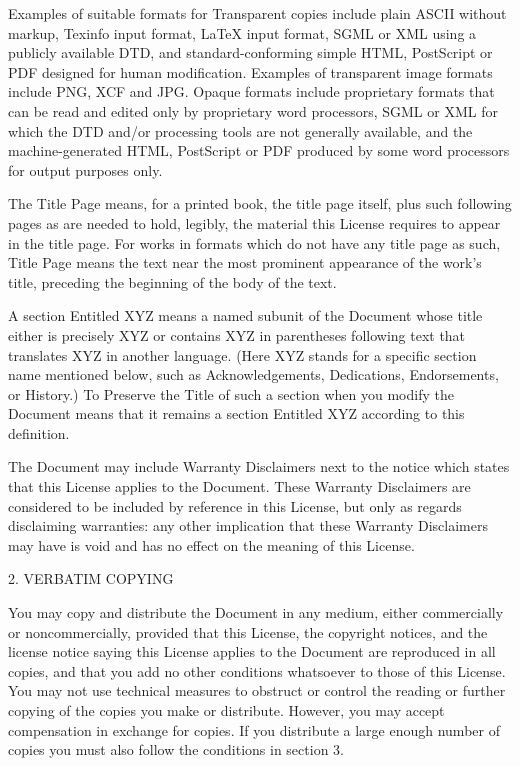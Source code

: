 \begin{noIndex}
Examples of suitable formats for Transparent copies include plain
ASCII without markup, Texinfo input format, LaTeX input format, SGML
or XML using a publicly available DTD, and standard-conforming simple
HTML, PostScript or PDF designed for human modification. Examples of
transparent image formats include PNG, XCF and JPG. Opaque formats
include proprietary formats that can be read and edited only by
proprietary word processors, SGML or XML for which the DTD and/or
processing tools are not generally available, and the
machine-generated HTML, PostScript or PDF produced by some word
processors for output purposes only.

The {\textquotedbl}Title Page{\textquotedbl} means, for a printed
book, the title page itself, plus such following pages as are needed
to hold, legibly, the material this License requires to appear in the
title page. For works in formats which do not have any title page as
such, {\textquotedbl}Title Page{\textquotedbl} means the text near the
most prominent appearance of the work's title, preceding the beginning
of the body of the text.

A section {\textquotedbl}Entitled XYZ{\textquotedbl} means a named
subunit of the Document whose title either is precisely XYZ or
contains XYZ in parentheses following text that translates XYZ in
another language. (Here XYZ stands for a specific section name
mentioned below, such as
{\textquotedbl}Acknowledgements{\textquotedbl},
{\textquotedbl}Dedications{\textquotedbl},
{\textquotedbl}Endorsements{\textquotedbl}, or
{\textquotedbl}History{\textquotedbl}.) To {\textquotedbl}Preserve the
Title{\textquotedbl} of such a section when you modify the Document
means that it remains a section {\textquotedbl}Entitled
XYZ{\textquotedbl} according to this definition.

The Document may include Warranty Disclaimers next to the notice which
states that this License applies to the Document.  These Warranty
Disclaimers are considered to be included by reference in this
License, but only as regards disclaiming warranties: any other
implication that these Warranty Disclaimers may have is void and has
no effect on the meaning of this License.


2. VERBATIM COPYING 

You may copy and distribute the Document in any medium, either
commercially or noncommercially, provided that this License, the
copyright notices, and the license notice saying this License applies
to the Document are reproduced in all copies, and that you add no
other conditions whatsoever to those of this License. You may not use
technical measures to obstruct or control the reading or further
copying of the copies you make or distribute. However, you may accept
compensation in exchange for copies. If you distribute a large enough
number of copies you must also follow the conditions in section 3.


\end{noIndex}
